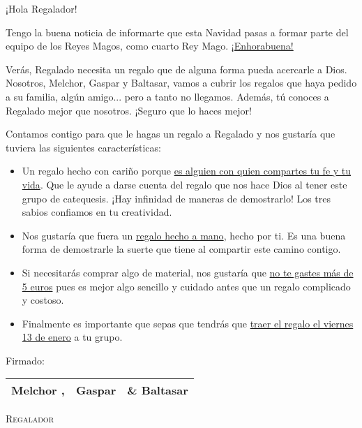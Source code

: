 \documentclass[11pt]{article}
\DeclareRobustCommand{\augiefamily}{%
  \fontfamily{augie}\fontseries{m}\fontshape{n}\selectfont}
\newcommand{\receiver}{Regalado\xspace}
\newcommand{\giver}{Regalador\xspace}
\begin{document}
\bsifamily



\large


¡Hola \giver!
	
	Tengo la buena noticia de informarte que esta Navidad pasas a formar parte del equipo de los Reyes Magos, como cuarto Rey Mago. \ul{¡Enhorabuena!}
	
	
	
	Verás, \LARGE{\receiver} \large necesita un regalo que de alguna forma pueda acercarle a Dios.
	Nosotros, Melchor, Gaspar y Baltasar, vamos a cubrir los regalos que haya pedido a su familia, algún amigo... pero a tanto no llegamos. Además, tú conoces a \receiver mejor que nosotros. ¡Seguro que lo haces mejor!
	
	Contamos contigo para que le hagas un regalo a \receiver y nos gustaría que tuviera las siguientes características:
	
	\vspace{-1em}
	\begin{itemize}
	        \item Un regalo hecho con cariño porque \ul{es alguien con quien compartes tu fe y tu vida}. Que le ayude a darse cuenta del regalo que nos hace Dios al tener este grupo de catequesis. ¡Hay infinidad de maneras de demostrarlo! Los tres sabios confiamos en tu creatividad.

	 
	
	        \item Nos gustaría que fuera un \ul{regalo hecho a mano}, hecho por ti. Es una buena forma de demostrarle la suerte que tiene al compartir este camino contigo.
	
	        \item Si necesitarás comprar algo de material, nos gustaría que \ul{no te gastes más de 5 euros} pues es mejor algo sencillo y cuidado antes que un regalo complicado y costoso.

	        \item Finalmente es importante que sepas que tendrás que \Large{\ul{traer el regalo el viernes 13 de enero}} a tu grupo.                         
	\end{itemize}

Firmado:
	
	\begin{center}
	\begin{tabular}{ccc}
	\augiefamily Melchor ,& \augiefamily Gaspar &  \augiefamily \& Baltasar\\\hline
	\end{tabular}
	\end{center}
	
\newpage


\Fontauri\bfseries\slshape


\vspace*{\fill}
\begin{center}
{\fontsize{65}{130}\textsc{\giver}}
\end{center}
\vspace*{\fill}
\end{document}
